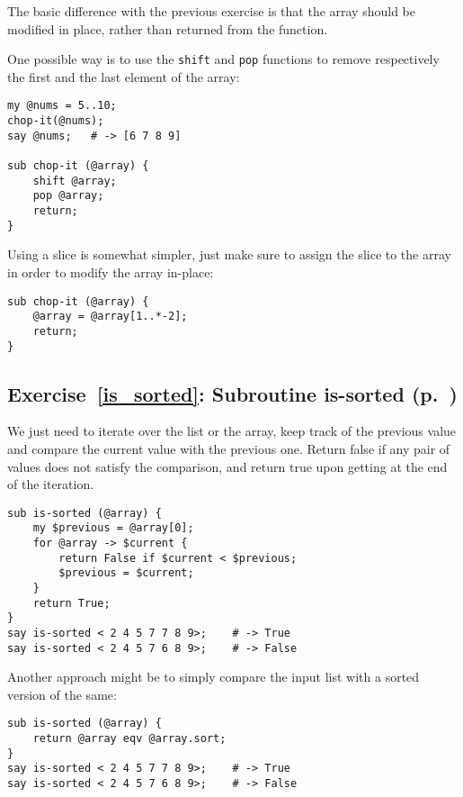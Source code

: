 {The basic difference with the previous exercise is that 
the array should be modified in place, rather than 
returned from the function.

One possible way is to use the {\tt shift} and 
{\tt pop} functions to remove respectively the first 
and the last element of the array:

\begin{verbatim}
my @nums = 5..10;
chop-it(@nums); 
say @nums;   # -> [6 7 8 9]

sub chop-it (@array) { 
    shift @array; 
    pop @array; 
    return;
}
\end{verbatim}

Using a slice is somewhat simpler, just make sure to 
assign the slice to the array in order to modify the 
array in-place:

\begin{verbatim}
sub chop-it (@array) { 
    @array = @array[1..*-2];
    return;
}
\end{verbatim}
%

\subsection{Exercise~\ref{is_sorted}: Subroutine is-sorted (p.~\pageref{is_sorted})}
\label{sol_is_sorted}

We just need to iterate over the list or the array, 
keep track of the previous value and compare the 
current value with the previous one. Return false if 
any pair of values does not satisfy the comparison, and 
return true upon getting at the end of the iteration.

\begin{verbatim}
sub is-sorted (@array) {
    my $previous = @array[0];
    for @array -> $current {
        return False if $current < $previous;
        $previous = $current;
    }
    return True;
}
say is-sorted < 2 4 5 7 7 8 9>;    # -> True
say is-sorted < 2 4 5 7 6 8 9>;    # -> False
\end{verbatim}

Another approach might be to simply compare the input 
list with a sorted version of the same:

\begin{verbatim}
sub is-sorted (@array) {
    return @array eqv @array.sort;
}
say is-sorted < 2 4 5 7 7 8 9>;    # -> True
say is-sorted < 2 4 5 7 6 8 9>;    # -> False
\end{verbatim}

}
